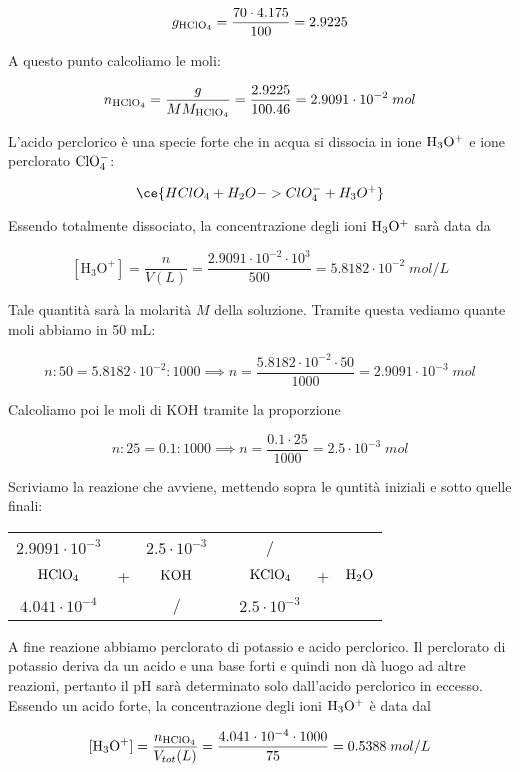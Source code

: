 $$g_{\rm HClO_4}=\frac{70 \cdot 4.175}{100}=2.9225$$

A questo punto calcoliamo le moli:

$$n_{\rm HClO_4}
=\frac{g}{MM_{\rm HClO_4}}
=\frac{2.9225}{100.46}=2.9091 \cdot 10^{-2}\;mol$$

L'acido perclorico è una specie forte che in acqua si dissocia in ione $\rm H_3O^+$ e ione perclorato $\rm ClO_4^-$:

$$\ce{HClO_4 + H_2O -> ClO_4^- + H_3O^+}$$

Essendo totalmente dissociato, la concentrazione degli ioni $\rm H_3O^+$ sarà data da

$$[\text{H}_3\text{O}^+]=\frac{n}{V(L)}=\frac{2.9091 \cdot 10^{-2} \cdot 10^{3}}{500}=5.8182 \cdot 10^{-2}\;mol/L$$

Tale quantità sarà la molarità $M$ della soluzione. Tramite questa vediamo quante moli abbiamo in 50 mL:

$$n:50=5.8182 \cdot 10^{-2}:1000
\implies
n=\frac{5.8182 \cdot 10^{-2} \cdot 50}{1000}
=2.9091 \cdot 10^{-3}\;mol$$

Calcoliamo poi le moli di KOH tramite la proporzione

$$n:25=0.1:1000
\implies
n=\frac{0.1 \cdot 25}{1000}
=2.5 \cdot 10^{-3}\;mol$$

Scriviamo la reazione che avviene, mettendo sopra le quntità iniziali e sotto quelle finali:

\begin{center}
    \begin{tabular}{ccccccc}
        $2.9091 \cdot 10^{-3}$ &  & $2.5 \cdot 10^{-3}$ & & / &&\\
        $\rm HClO_4$ & + & $\rm KOH$ & \ce{->} & $\rm KClO_4$ & + & $\rm H_2O$\\
        $4.041 \cdot 10^{-4}$ &  & / & & $2.5 \cdot 10^{-3}$ &&\\
    \end{tabular}
\end{center}

A fine reazione abbiamo perclorato di potassio e acido perclorico. Il perclorato di potassio deriva da un acido e una base forti e quindi non dà luogo ad altre reazioni, pertanto il pH sarà determinato solo dall'acido perclorico in eccesso. Essendo un acido forte, la concentrazione degli ioni $\rm H_3O^+$ è data dal

$$[\text{H}_3\text{O}^+]=\frac{n_{\rm HClO_4}}{V_{tot}(L)}=\frac{4.041 \cdot 10^{-4} \cdot 1000}{75}=0.5388\;mol/L$$

